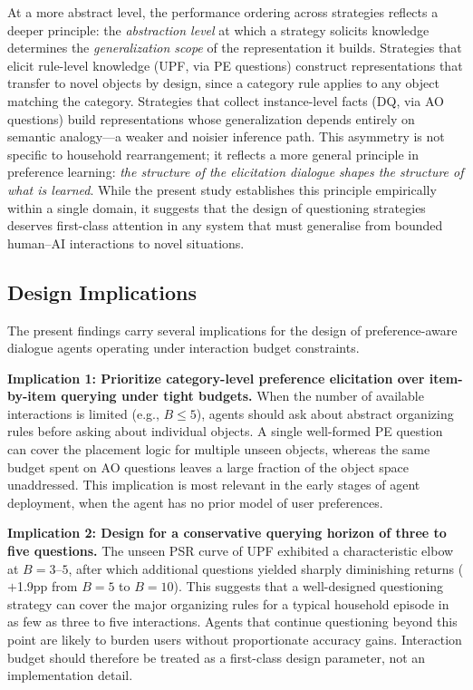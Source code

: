 \documentclass[manuscript,review,anonymous]{acmart}
\begin{document}
{At a more abstract level, the performance ordering across strategies reflects a deeper principle: the \textit{abstraction level} at which a strategy solicits knowledge determines the \textit{generalization scope} of the representation it builds. Strategies that elicit rule-level knowledge (UPF, via PE questions) construct representations that transfer to novel objects by design, since a category rule applies to any object matching the category. Strategies that collect instance-level facts (DQ, via AO questions) build representations whose generalization depends entirely on semantic analogy---a weaker and noisier inference path. This asymmetry is not specific to household rearrangement; it reflects a more general principle in preference learning: \textit{the structure of the elicitation dialogue shapes the structure of what is learned}. While the present study establishes this principle empirically within a single domain, it suggests that the design of questioning strategies deserves first-class attention in any system that must generalise from bounded human--AI interactions to novel situations.

\subsection{Design Implications}

The present findings carry several implications for the design of preference-aware dialogue agents operating under interaction budget constraints.

\textbf{Implication 1: Prioritize category-level preference elicitation over item-by-item querying under tight budgets.} When the number of available interactions is limited (e.g., $B \leq 5$), agents should ask about abstract organizing rules before asking about individual objects. A single well-formed PE question can cover the placement logic for multiple unseen objects, whereas the same budget spent on AO questions leaves a large fraction of the object space unaddressed. This implication is most relevant in the early stages of agent deployment, when the agent has no prior model of user preferences.

\textbf{Implication 2: Design for a conservative querying horizon of three to five questions.} The unseen PSR curve of UPF exhibited a characteristic elbow at $B=3$--$5$, after which additional questions yielded sharply diminishing returns ($+$1.9pp from $B=5$ to $B=10$). This suggests that a well-designed questioning strategy can cover the major organizing rules for a typical household episode in as few as three to five interactions. Agents that continue questioning beyond this point are likely to burden users without proportionate accuracy gains. Interaction budget should therefore be treated as a first-class design parameter, not an implementation detail.

}
\end{document}
